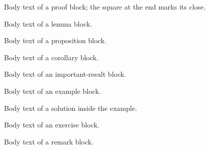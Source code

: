 \begin{ELproof}{}

Body text of a proof block; the square at the end marks its close.

\end{ELproof}

\begin{ELlemma}{}

Body text of a lemma block.

\end{ELlemma}

\begin{ELproposition}{}

Body text of a proposition block.

\end{ELproposition}

\begin{ELcorollary}{}

Body text of a corollary block.

\end{ELcorollary}

\begin{ELimportant}{}

Body text of an important-result block.

\end{ELimportant}

\begin{ELexample}{}

Body text of an example block.

\begin{ELsolution}

Body text of a solution inside the example.

\end{ELsolution}

\end{ELexample}

\begin{ELexercise}{}

Body text of an exercise block.

\end{ELexercise}

\begin{ELremark}{}

Body text of a remark block.

\end{ELremark}

